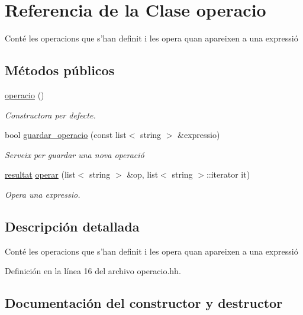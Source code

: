 \hypertarget{classoperacio}{}\section{Referencia de la Clase operacio}
\label{classoperacio}


Conté les operacions que s’han definit i les opera quan apareixen a una expressió  


\subsection*{Métodos públicos}
\begin{DoxyCompactItemize}
\item 
\hyperlink{classoperacio_aa16956dfb69552de3ff43261de600bbe}{operacio} ()
\begin{DoxyCompactList}\small\item\em Constructora per defecte. \end{DoxyCompactList}\item 
bool \hyperlink{classoperacio_aa1f42a80cc416ff33caea9898fe3c9b9}{guardar\+\_\+operacio} (const list$<$ string $>$ \&expressio)
\begin{DoxyCompactList}\small\item\em Serveix per guardar una nova operació \end{DoxyCompactList}\item 
\hyperlink{classresultat}{resultat} \hyperlink{classoperacio_ab64cf3a9e19efd65c2ea3fe276cfabaf}{operar} (list$<$ string $>$ \&op, list$<$ string $>$\+::iterator it)
\begin{DoxyCompactList}\small\item\em Opera una expressio. \end{DoxyCompactList}\end{DoxyCompactItemize}


\subsection{Descripción detallada}
Conté les operacions que s’han definit i les opera quan apareixen a una expressió 

Definición en la línea 16 del archivo operacio.\+hh.



\subsection{Documentación del constructor y destructor}
\hypertarget{classoperacio_aa16956dfb69552de3ff43261de600bbe}{}\label{classoperacio_aa16956dfb69552de3ff43261de600bbe} 
